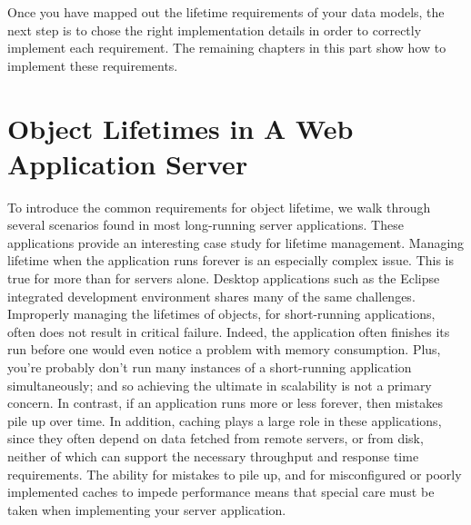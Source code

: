Once you have mapped out the lifetime requirements of your data models, the next
step is to chose the right implementation details in order to correctly implement
each requirement. The remaining chapters in this part show how to implement these
requirements.



\section{Object Lifetimes in A Web Application Server}


To introduce the common requirements for object lifetime, we walk through several
scenarios found in most long-running server applications. These applications
provide an interesting case study for lifetime management. Managing lifetime when
the application runs forever is an especially complex issue. This is true for
more than for servers alone. Desktop applications such as the Eclipse integrated
development environment shares many of the same challenges. Improperly managing
the lifetimes of objects, for short-running applications, often does not result
in critical failure. Indeed, the application often finishes its run before one
would even notice a problem with memory consumption. Plus, you're probably don't
run many instances of a short-running application simultaneously; and so
achieving the ultimate in scalability is not a primary concern. In contrast, if
an application runs more or less forever, then mistakes pile up over time. In
addition, caching plays a large role in these applications, since they often
depend on data fetched from remote servers, or from disk, neither of which can
support the necessary throughput and response time requirements. The ability for
mistakes to pile up, and for misconfigured or poorly implemented caches to impede
performance means that special care must be taken when implementing your server application.


